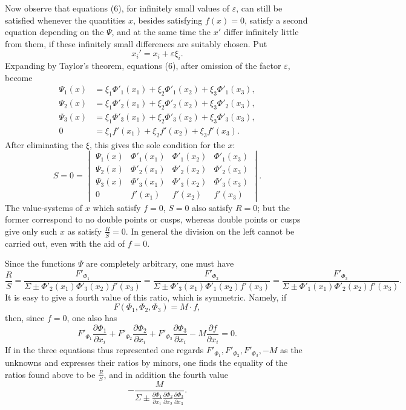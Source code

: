 \documentclass[10pt]{article}
\begin{document}
Now observe that equations (6), for infinitely small values of \(\varepsilon\), can still be satisfied whenever the quantities \(x\), besides satisfying \(f(x)=0\), satisfy a second equation depending on the \(\Psi\), and at the same time the \(x'\) differ infinitely little from them, if these infinitely small differences are suitably chosen. Put
\[
x_i'=x_i+\varepsilon\xi_i.
\]
Expanding by Taylor's theorem, equations (6), after omission of the factor \(\varepsilon\), become
\[
\begin{aligned}
\Psi_1(x)&=\xi_1\Phi'_1(x_1)+\xi_2\Phi'_1(x_2)+\xi_3\Phi'_1(x_3),\\
\Psi_2(x)&=\xi_1\Phi'_2(x_1)+\xi_2\Phi'_2(x_2)+\xi_3\Phi'_2(x_3),\\
\Psi_3(x)&=\xi_1\Phi'_3(x_1)+\xi_2\Phi'_3(x_2)+\xi_3\Phi'_3(x_3),\\
0&=\xi_1f'(x_1)+\xi_2f'(x_2)+\xi_3f'(x_3).
\end{aligned}
\]
After eliminating the \(\xi\), this gives the sole condition for the \(x\):
\[
S=0=
\begin{vmatrix}
\Psi_1(x)&\Phi'_1(x_1)&\Phi'_1(x_2)&\Phi'_1(x_3)\\
\Psi_2(x)&\Phi'_2(x_1)&\Phi'_2(x_2)&\Phi'_2(x_3)\\
\Psi_3(x)&\Phi'_3(x_1)&\Phi'_3(x_2)&\Phi'_3(x_3)\\
0&f'(x_1)&f'(x_2)&f'(x_3)
\end{vmatrix}.
\]
The value-systems of \(x\) which satisfy \(f=0\), \(S=0\) also satisfy \(R=0\); but the former correspond to no double points or cusps, whereas double points or cusps give only such \(x\) as satisfy \(\frac{R}{S}=0\). In general the division on the left cannot be carried out, even with the aid of \(f=0\).

Since the functions \(\Psi\) are completely arbitrary, one must have
\[
\frac{R}{S}
=\frac{F'_{\Phi_1}}{\Sigma\pm\Phi'_2(x_1)\Phi'_3(x_2)f'(x_3)}
=\frac{F'_{\Phi_2}}{\Sigma\pm\Phi'_3(x_1)\Phi'_1(x_2)f'(x_3)}
=\frac{F'_{\Phi_3}}{\Sigma\pm\Phi'_1(x_1)\Phi'_2(x_2)f'(x_3)}.
\]
It is easy to give a fourth value of this ratio, which is symmetric. Namely, if
\[
F(\Phi_1,\Phi_2,\Phi_3)=M\cdot f,
\]
then, since \(f=0\), one also has
\[
F'_{\Phi_1}\frac{\partial\Phi_1}{\partial x_i}
+F'_{\Phi_2}\frac{\partial\Phi_2}{\partial x_i}
+F'_{\Phi_3}\frac{\partial\Phi_3}{\partial x_i}
-M\frac{\partial f}{\partial x_i}=0.
\]
If in the three equations thus represented one regards \(F'_{\Phi_1},F'_{\Phi_2},F'_{\Phi_3},-M\) as the unknowns and expresses their ratios by minors, one finds the equality of the ratios found above to be \(\frac{R}{S}\), and in addition the fourth value
\[
-\frac{M}{\Sigma\pm
\frac{\partial\Phi_1}{\partial x_1}
\frac{\partial\Phi_2}{\partial x_2}
\frac{\partial\Phi_3}{\partial x_3}}.
\]
\end{document}
